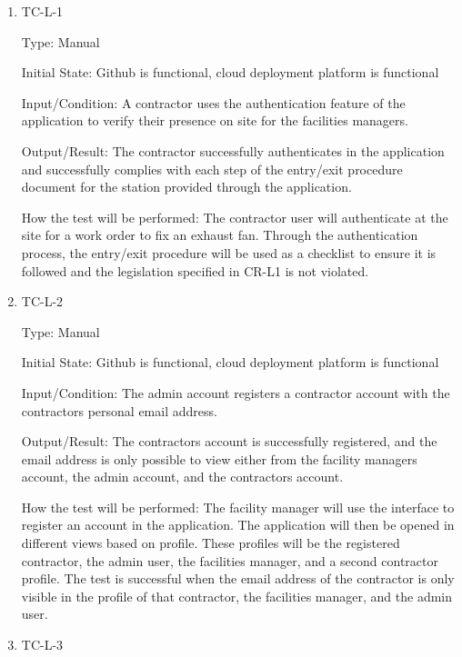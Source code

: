 \documentclass[12pt, titlepage]{article}
\begin{document}
\begin{enumerate}

  \item{TC-L-1\\}

    Type: Manual

    Initial State: Github is functional, cloud deployment platform is functional

    Input/Condition: A contractor uses the authentication feature of
    the application
    to verify their presence on site for the facilities managers.

    Output/Result: The contractor successfully authenticates in the application
    and successfully complies with each step of the entry/exit
    procedure document
    for the station provided through the application.

    How the test will be performed: The contractor user will authenticate at the
    site for a work order to fix an exhaust fan. Through the
    authentication process,
    the entry/exit procedure will be used as a checklist to ensure it
    is followed
    and the legislation specified in CR-L1 is not violated.

  \item{TC-L-2\\}

    Type: Manual

    Initial State: Github is functional, cloud deployment platform is functional

    Input/Condition: The admin account registers a contractor account with the
    contractors personal email address.

    Output/Result: The contractors account is successfully
    registered, and the email
    address is only possible to view either from the facility managers
    account, the admin
    account, and the contractors account.

    How the test will be performed: The facility manager will use the
    interface to
    register an account in the application. The application will then
    be opened in
    different views based on profile. These profiles will be the
    registered contractor,
    the admin user, the facilities manager, and a second contractor profile.
    The test is successful when the email address of the contractor is only
    visible in the profile of that contractor, the facilities manager,
    and the admin user.

  \item{TC-L-3\\}


\end{enumerate}
\end{document}
